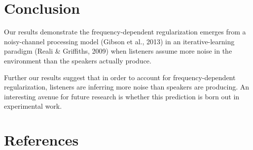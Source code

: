 \documentclass[10pt, letterpaper]{article}
\begin{document}
\hypertarget{conclusion}{%
\section{Conclusion}\label{conclusion}}

Our results demonstrate the frequency-dependent regularization emerges
from a noisy-channel processing model (Gibson et al., 2013) in an
iterative-learning paradigm (Reali \& Griffiths, 2009) when listeners
assume more noise in the environment than the speakers actually produce.

Further our results suggest that in order to account for
frequency-dependent regularization, listeners are inferring more noise
than speakers are producing. An interesting avenue for future research
is whether this prediction is born out in experimental work.

\hypertarget{references}{%
\section{References}\label{references}}

\setlength{\parindent}{-0.1in} 
\setlength{\leftskip}{0.125in}

\noindent
\end{document}

